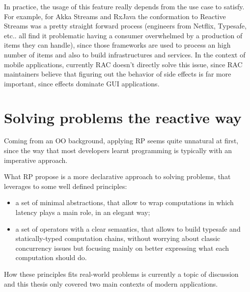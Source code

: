 In practice, the usage of this feature really depends from the use case
to satisfy. For example, for Akka Streams and RxJava the conformation to
Reactive Streams was a pretty straight forward process (engineers from
Netflix, Typesafe, etc.. all find it problematic having a consumer
overwhelmed by a production of items they can handle), since those
frameworks are used to process an high number of items and also to build
infrastructures and services. In the context of mobile applications,
currently RAC doesn't directly solve this issue, since RAC maintainers
believe that figuring out the behavior of side effects is far more
important, since effects dominate GUI applications.

\section{Solving problems the reactive
way}\label{solving-problems-the-reactive-way}

Coming from an OO background, applying RP seems quite unnatural at
first, since the way that most developers learnt programming is
typically with an imperative approach.

What RP propose is a more declarative approach to solving problems, that
leverages to some well defined principles:

\begin{itemize}
\itemsep1pt\parskip0pt
\item
  a set of minimal abstractions, that allow to wrap computations in
  which latency plays a main role, in an elegant way;
\item
  a set of operators with a clear semantics, that allows to build
  typesafe and statically-typed computation chains, without worrying
  about classic concurrency issues but focusing mainly on better
  expressing what each computation should do.
\end{itemize}

How these principles fits real-world problems is currently a topic of
discussion and this thesis only covered two main contexts of modern
applications.


